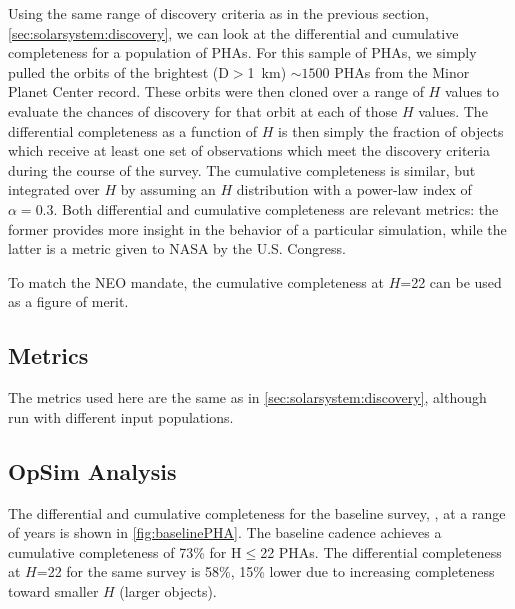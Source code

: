 Using the same range of discovery criteria as in the previous section,
\ref{sec:solarsystem:discovery}, we can look at the differential and
cumulative completeness for a population of PHAs. For this sample of
PHAs, we simply pulled the orbits of the brightest (D$>$1~km)
$\sim1500$ PHAs from the Minor Planet Center record. These orbits were
then cloned over a range of $H$ values to evaluate the chances of
discovery for that orbit at each of those $H$ values. The differential
completeness as a function of $H$ is then simply the fraction of
objects which receive at least one set of observations which meet the
discovery criteria during the course of the survey. The cumulative
completeness is similar, but integrated over $H$ by assuming an $H$
distribution with a power-law index of $\alpha=0.3$. Both
differential and cumulative completeness are relevant metrics: the
former provides more insight in the behavior of a particular
simulation, while the latter is a metric given to NASA by the U.S.
Congress. 

To match the NEO mandate, the cumulative completeness at $H$=22 can be
used as a figure of merit.


\subsection{Metrics}
\label{sec:\secname:metrics}

The metrics used here are the same as in
\ref{sec:solarsystem:discovery}, although run with different input populations.


\subsection{OpSim Analysis}
\label{sec:\secname:analysis}

The differential and cumulative completeness for the baseline survey,
, at a range of years is shown in
\autoref{fig:baselinePHA}. The baseline cadence achieves a cumulative completeness of 73\% for
H$\le$22 PHAs. The differential completeness at $H$=22 for the same
survey is 58\%, 15\% lower due to increasing completeness toward
smaller $H$ (larger objects). 

